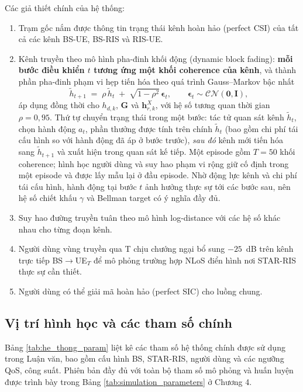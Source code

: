 Các giả thiết chính của hệ thống:
\begin{enumerate}[label=(G\arabic*),leftmargin=*]
\item Trạm gốc nắm được thông tin trạng thái kênh hoàn hảo (perfect CSI)
của tất cả các kênh BS-UE, BS-RIS và RIS-UE.
\item Kênh truyền theo mô hình pha-đinh khối động (dynamic block fading):
\textbf{mỗi bước điều khiển $t$ tương ứng một khối coherence của kênh},
và thành phần pha-đinh phạm vi hẹp tiến hóa theo quá trình
Gauss--Markov bậc nhất
\begin{equation}
\tilde{h}_{t+1} \;=\; \rho\,\tilde{h}_t \;+\; \sqrt{1-\rho^2}\,
\boldsymbol{\epsilon}_t, \qquad \boldsymbol{\epsilon}_t \sim
\mathcal{CN}(\mathbf{0}, \mathbf{I}),
\label{eq:gauss_markov}
\end{equation}
áp dụng đồng thời cho $h_{d,k}$, $\mathbf{G}$ và $\mathbf{h}_{r,k}^X$,
với hệ số tương quan thời gian $\rho = 0{,}95$. Thứ tự chuyển trạng
thái trong một bước: tác tử quan sát kênh $\tilde{h}_t$, chọn hành động
$a_t$, phần thưởng được tính trên chính $\tilde{h}_t$ (bao gồm chi phí
tái cấu hình so với hành động đã áp ở bước trước), \emph{sau đó} kênh
mới tiến hóa sang $\tilde{h}_{t+1}$ và xuất hiện trong quan sát kế
tiếp. Một episode gồm $T=50$ khối coherence; hình học người dùng và
suy hao phạm vi rộng giữ cố định trong một episode và được lấy mẫu lại
ở đầu episode. Nhờ động lực kênh và chi phí tái cấu hình, hành động tại
bước $t$ ảnh hưởng thực sự tới các bước sau, nên hệ số chiết khấu
$\gamma$ và Bellman target có ý nghĩa đầy đủ.
\item Suy hao đường truyền tuân theo mô hình log-distance với các hệ số
khác nhau cho từng đoạn kênh.
\item Người dùng vùng truyền qua T chịu chướng ngại bổ sung $-25$~dB
trên kênh trực tiếp BS$\to$UE$_T$ để mô phỏng trường hợp NLoS điển hình
nơi STAR-RIS thực sự cần thiết.
\item Người dùng có thể giải mã hoàn hảo (perfect SIC) cho luồng chung.
\end{enumerate}

\subsection{Vị trí hình học và các tham số chính}

Bảng \ref{tab:he_thong_param} liệt kê các tham số hệ thống chính được sử
dụng trong Luận văn, bao gồm cấu hình BS, STAR-RIS, người dùng và các
ngưỡng QoS, công suất. Phiên bản đầy đủ với toàn bộ tham số mô phỏng và
huấn luyện được trình bày trong Bảng \ref{tab:simulation_parameters} ở
Chương 4.


